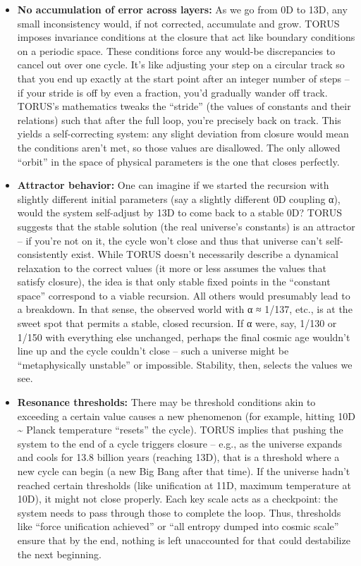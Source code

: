 \begin{itemize}
\item
  \textbf{No accumulation of error across layers:} As we go from 0D to
  13D, any small inconsistency would, if not corrected, accumulate and
  grow. TORUS imposes invariance conditions at the closure that act like
  boundary conditions on a periodic space​. These conditions force any
  would-be discrepancies to cancel out over one cycle. It's like
  adjusting your step on a circular track so that you end up exactly at
  the start point after an integer number of steps -- if your stride is
  off by even a fraction, you'd gradually wander off track. TORUS's
  mathematics tweaks the ``stride'' (the values of constants and their
  relations) such that after the full loop, you're precisely back on
  track. This yields a self-correcting system: any slight deviation from
  closure would mean the conditions aren't met, so those values are
  disallowed. The only allowed ``orbit'' in the space of physical
  parameters is the one that closes perfectly.
\item
  \textbf{Attractor behavior:} One can imagine if we started the
  recursion with slightly different initial parameters (say a slightly
  different 0D coupling α), would the system self-adjust by 13D to come
  back to a stable 0D? TORUS suggests that the stable solution (the real
  universe's constants) is an attractor -- if you're not on it, the
  cycle won't close and thus that universe can't self-consistently
  exist. While TORUS doesn't necessarily describe a dynamical relaxation
  to the correct values (it more or less assumes the values that satisfy
  closure), the idea is that only stable fixed points in the ``constant
  space'' correspond to a viable recursion. All others would presumably
  lead to a breakdown. In that sense, the observed world with α ≈ 1/137,
  etc., is at the sweet spot that permits a stable, closed recursion. If
  α were, say, 1/130 or 1/150 with everything else unchanged, perhaps
  the final cosmic age wouldn't line up and the cycle couldn't close --
  such a universe might be ``metaphysically unstable'' or impossible.
  Stability, then, selects the values we see.
\item
  \textbf{Resonance thresholds:} There may be threshold conditions akin
  to exceeding a certain value causes a new phenomenon (for example,
  hitting 10D \textasciitilde{} Planck temperature ``resets'' the
  cycle). TORUS implies that pushing the system to the end of a cycle
  triggers closure -- e.g., as the universe expands and cools for 13.8
  billion years (reaching 13D), that is a threshold where a new cycle
  can begin (a new Big Bang after that time). If the universe hadn't
  reached certain thresholds (like unification at 11D, maximum
  temperature at 10D), it might not close properly. Each key scale acts
  as a checkpoint: the system needs to pass through those to complete
  the loop. Thus, thresholds like ``force unification achieved'' or
  ``all entropy dumped into cosmic scale'' ensure that by the end,
  nothing is left unaccounted for that could destabilize the next
  beginning.
\end{itemize}

